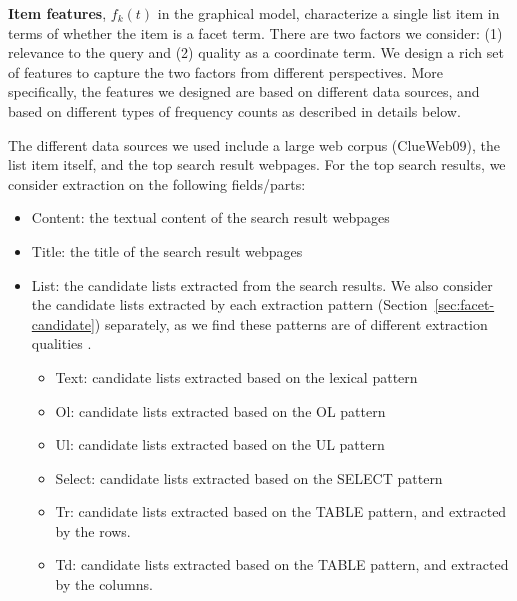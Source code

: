 \textbf{Item features}, $f_k(t)$ in the graphical model, characterize a single list item in terms of whether the item is a facet term. There are two factors we consider: (1) relevance to the query and (2) quality as a coordinate term. We design a rich set of features to capture the two factors from different perspectives. More specifically, the features we designed are based on different data sources, and based on different types of frequency counts as described in details below.

The different data sources we used include a large web corpus (ClueWeb09), the list item itself, and the top search result webpages. For the top search results, we consider extraction on the following fields/parts:
\begin{itemize}
 \item Content: the textual content of the search result webpages
 \item Title: the title of the search result webpages
 \item List: the candidate lists extracted from the search results. We also consider the candidate lists extracted by each extraction pattern (Section~\ref{sec:facet-candidate}) separately, as we find these patterns are of different extraction qualities .
  \begin{itemize}
   \item Text: candidate lists extracted based on the lexical pattern
   \item Ol: candidate lists extracted based on the OL pattern
   \item Ul: candidate lists extracted based on the UL pattern
   \item Select: candidate lists extracted based on the SELECT pattern
   \item Tr: candidate lists extracted based on the TABLE pattern, and extracted by the rows.
   \item Td: candidate lists extracted based on the TABLE pattern, and extracted by the columns.
  \end{itemize}
\end{itemize}

